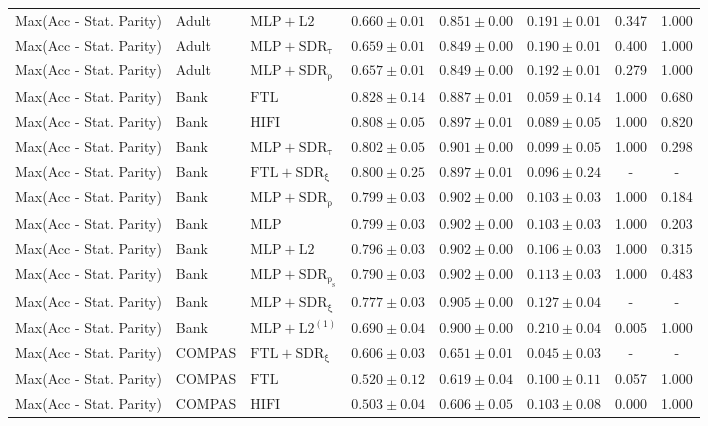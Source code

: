 \begin{table}[htbp]
\begin{tabular}{lllccccc}
Max(Acc - Stat. Parity) & Adult & $\mathrm{MLP+L2}$ & $0.660 \pm0.01$ & $0.851 \pm0.00$ & $0.191 \pm0.01$ & 0.347 & 1.000 \\
Max(Acc - Stat. Parity) & Adult & $\mathrm{MLP+SDR_{\tau}}$ & $0.659 \pm0.01$ & $0.849 \pm0.00$ & $0.190 \pm0.01$ & 0.400 & 1.000 \\
Max(Acc - Stat. Parity) & Adult & $\mathrm{MLP+SDR_{\rho}}$ & $0.657 \pm0.01$ & $0.849 \pm0.00$ & $0.192 \pm0.01$ & 0.279 & 1.000 \\
Max(Acc - Stat. Parity) & Bank & $\mathrm{FTL}$ & $0.828 \pm0.14$ & $0.887 \pm0.01$ & $0.059 \pm0.14$ & 1.000 & 0.680 \\
Max(Acc - Stat. Parity) & Bank & $\mathrm{HIFI}$ & $0.808 \pm0.05$ & $0.897 \pm0.01$ & $0.089 \pm0.05$ & 1.000 & 0.820 \\
Max(Acc - Stat. Parity) & Bank & $\mathrm{MLP+SDR_{\tau}}$ & $0.802 \pm0.05$ & $0.901 \pm0.00$ & $0.099 \pm0.05$ & 1.000 & 0.298 \\
Max(Acc - Stat. Parity) & Bank & $\mathrm{FTL+SDR_{\xi}}$ & $0.800 \pm0.25$ & $0.897 \pm0.01$ & $0.096 \pm0.24$ & - & - \\
Max(Acc - Stat. Parity) & Bank & $\mathrm{MLP+SDR_{\rho}}$ & $0.799 \pm0.03$ & $0.902 \pm0.00$ & $0.103 \pm0.03$ & 1.000 & 0.184 \\
Max(Acc - Stat. Parity) & Bank & $\mathrm{MLP}$ & $0.799 \pm0.03$ & $0.902 \pm0.00$ & $0.103 \pm0.03$ & 1.000 & 0.203 \\
Max(Acc - Stat. Parity) & Bank & $\mathrm{MLP+L2}$ & $0.796 \pm0.03$ & $0.902 \pm0.00$ & $0.106 \pm0.03$ & 1.000 & 0.315 \\
Max(Acc - Stat. Parity) & Bank & $\mathrm{MLP+SDR_{\rho_s}}$ & $0.790 \pm0.03$ & $0.902 \pm0.00$ & $0.113 \pm0.03$ & 1.000 & 0.483 \\
Max(Acc - Stat. Parity) & Bank & $\mathrm{MLP+SDR_{\xi}}$ & $0.777 \pm0.03$ & $0.905 \pm0.00$ & $0.127 \pm0.04$ & - & - \\
Max(Acc - Stat. Parity) & Bank & $\mathrm{MLP+L2^{(1)}}$ & $0.690 \pm0.04$ & $0.900 \pm0.00$ & $0.210 \pm0.04$ & 0.005 & 1.000 \\
Max(Acc - Stat. Parity) & COMPAS & $\mathrm{FTL+SDR_{\xi}}$ & $0.606 \pm0.03$ & $0.651 \pm0.01$ & $0.045 \pm0.03$ & - & - \\
Max(Acc - Stat. Parity) & COMPAS & $\mathrm{FTL}$ & $0.520 \pm0.12$ & $0.619 \pm0.04$ & $0.100 \pm0.11$ & 0.057 & 1.000 \\
Max(Acc - Stat. Parity) & COMPAS & $\mathrm{HIFI}$ & $0.503 \pm0.04$ & $0.606 \pm0.05$ & $0.103 \pm0.08$ & 0.000 & 1.000 \\

\end{tabular}
\end{table}
